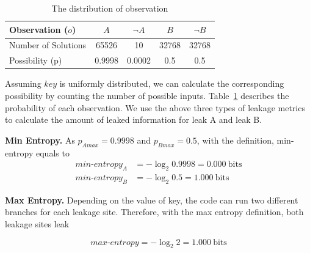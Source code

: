\begin{table}[ht]
    \centering\small\footnotesize
    \caption{The distribution of observation}\label{shtable}
    \begin{tabular}{l|cc|cc}
        \hline

        Observation ($o$)   & $A$    & $\neg A$ & $B$   & $\neg B$ \\ \hline
        Number of Solutions & 65526  & 10       & 32768 & 32768    \\ \hline
        Possibility (p)     & 0.9998 & 0.0002   & 0.5   & 0.5      \\
        \hline
    \end{tabular}
\end{table}

Assuming $\mathit{key}$ is uniformly distributed, we can calculate the corresponding
possibility by counting the number of possible inputs. Table~\ref{shtable}
describes the probability of each observation. We use the above three types of
leakage metrics to calculate the amount of leaked information for leak A and leak B.

\textbf{Min Entropy.}
As $p_{A\mathit{max}} = 0.9998$ and $p_{B\mathit{max}} = 0.5$,
with the definition, min-entropy equals to
\begin{align*}
    \mathit{min\text{-}entropy_A} & = -\log_2{0.9998} = 0.000\ \mathrm{bits} \\
    \mathit{min\text{-}entropy_B} & = -\log_2{0.5} = 1.000\ \mathrm{bits}
\end{align*}

\textbf{Max Entropy.}
Depending on the value of key, the code can run two different branches for each leakage site.
Therefore, with the max entropy
definition, both leakage sites leak

\begin{displaymath}
    \mathit{max\text{-}entropy} = -\log_2{2} = 1.000\ \mathrm{bits}
\end{displaymath}

